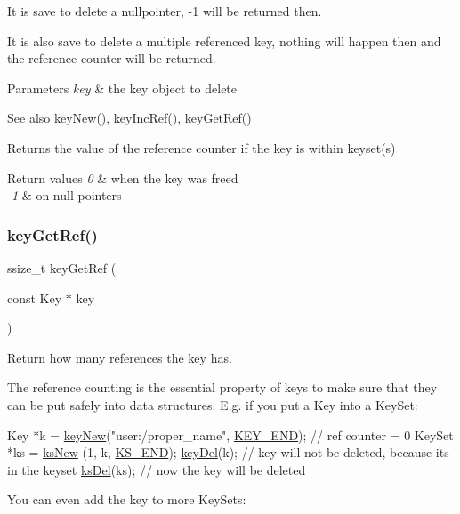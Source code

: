 It is save to delete a nullpointer, -\/1 will be returned then.

It is also save to delete a multiple referenced key, nothing will happen then and the reference counter will be returned.


\begin{DoxyParams}{Parameters}
{\em key} & the key object to delete \\
\hline
\end{DoxyParams}
\begin{DoxySeeAlso}{See also}
\hyperlink{group__key_gad23c65b44bf48d773759e1f9a4d43b89}{key\+New()}, \hyperlink{group__key_ga6970a6f254d67af7e39f8e469bb162f1}{key\+Inc\+Ref()}, \hyperlink{group__key_ga4aabc4272506dd63161db2bbb42de8ae}{key\+Get\+Ref()} 
\end{DoxySeeAlso}
\begin{DoxyReturn}{Returns}
the value of the reference counter if the key is within keyset(s) 
\end{DoxyReturn}

\begin{DoxyRetVals}{Return values}
{\em 0} & when the key was freed \\
\hline
{\em -\/1} & on null pointers \\
\hline
\end{DoxyRetVals}
\mbox{\label{group__key_ga4aabc4272506dd63161db2bbb42de8ae}} 
\subsubsection{\texorpdfstring{key\+Get\+Ref()}{keyGetRef()}}
{\footnotesize\ttfamily ssize\+\_\+t key\+Get\+Ref (\begin{DoxyParamCaption}\item[{const Key $\ast$}]{key }\end{DoxyParamCaption})}



Return how many references the key has. 

The reference counting is the essential property of keys to make sure that they can be put safely into data structures. E.\+g. if you put a Key into a Key\+Set\+:


\begin{DoxyCodeInclude}
Key *k = \hyperlink{group__key_gad23c65b44bf48d773759e1f9a4d43b89}{keyNew}(\textcolor{stringliteral}{"user:/proper\_name"}, \hyperlink{group__key_gga9b703ca49f48b482def322b77d3e6bc8aa8adb6fcb92dec58fb19410eacfdd403}{KEY\_END}); \textcolor{comment}{// ref counter = 0}
KeySet *ks = \hyperlink{group__keyset_ga671e1aaee3ae9dc13b4834a4ddbd2c3c}{ksNew} (1, k, \hyperlink{group__keyset_ga7a28fce3773b2c873c94ac80b8b4cd54}{KS\_END});
\hyperlink{group__key_ga3df95bbc2494e3e6703ece5639be5bb1}{keyDel}(k); \textcolor{comment}{// key will not be deleted, because its in the keyset}
\hyperlink{group__keyset_ga27e5c16473b02a422238c8d970db7ac8}{ksDel}(ks); \textcolor{comment}{// now the key will be deleted}
\end{DoxyCodeInclude}
 You can even add the key to more Key\+Sets\+:


